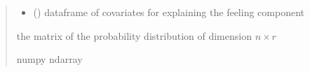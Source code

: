 \documentclass[letterpaper,10pt,english]{sphinxmanual}
\begin{document}
\begin{fulllineitems}
\begin{quote}
\begin{description}
\begin{itemize}
\item {} 
\sphinxAtStartPar
{} () \textendash{} dataframe of covariates for explaining the feeling component

\end{itemize}

\sphinxAtStartPar
the matrix of the probability distribution of dimension \(n \times r\)

\sphinxAtStartPar
numpy ndarray

\end{description}\end{quote}

\end{fulllineitems}

\end{document}
